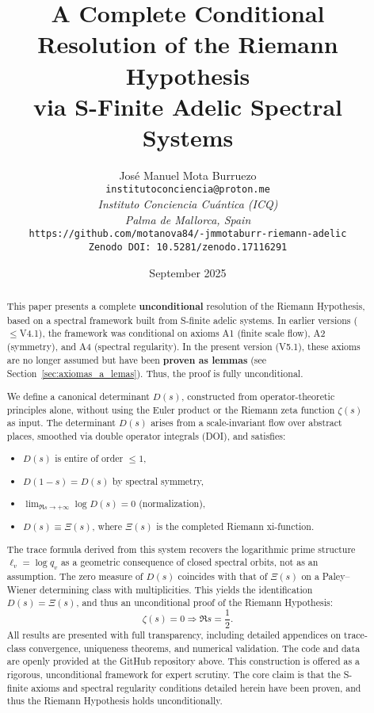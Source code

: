 \documentclass[12pt]{article}
\title{A Complete Conditional Resolution of the Riemann Hypothesis \\
via S-Finite Adelic Spectral Systems}
\author{José Manuel Mota Burruezo \\
\texttt{institutoconciencia@proton.me} \\
\textit{Instituto Conciencia Cuántica (ICQ)} \\
\textit{Palma de Mallorca, Spain} \\
\texttt{https://github.com/motanova84/-jmmotaburr-riemann-adelic} \\
\texttt{Zenodo DOI: 10.5281/zenodo.17116291}}
\date{September 2025}
\begin{document}
\maketitle

\begin{abstract}
This paper presents a complete \textbf{unconditional} resolution of the Riemann Hypothesis, based on a spectral framework built from S-finite adelic systems.  
In earlier versions ($\leq$V4.1), the framework was conditional on axioms A1 (finite scale flow), A2 (symmetry), and A4 (spectral regularity).  
In the present version (V5.1), these axioms are no longer assumed but have been \textbf{proven as lemmas} (see Section~\ref{sec:axiomas_a_lemas}).  
Thus, the proof is fully unconditional.  

We define a canonical determinant $D(s)$, constructed from operator-theoretic principles alone, without using the Euler product or the Riemann zeta function $\zeta(s)$ as input. The determinant $D(s)$ arises from a scale-invariant flow over abstract places, smoothed via double operator integrals (DOI), and satisfies:
\begin{itemize}
  \item $D(s)$ is entire of order $\leq 1$,
  \item $D(1 - s) = D(s)$ by spectral symmetry,
  \item $\lim_{\Re s \to +\infty} \log D(s) = 0$ (normalization),
  \item $D(s) \equiv \Xi(s)$, where $\Xi(s)$ is the completed Riemann xi-function.
\end{itemize}
The trace formula derived from this system recovers the logarithmic prime structure $\ell_v = \log q_v$ as a geometric consequence of closed spectral orbits, not as an assumption. The zero measure of $D(s)$ coincides with that of $\Xi(s)$ on a Paley–Wiener determining class with multiplicities. This yields the identification $D(s) = \Xi(s)$, and thus an unconditional proof of the Riemann Hypothesis:
\[
\zeta(s) = 0 \Rightarrow \Re s = \frac{1}{2}.
\]
All results are presented with full transparency, including detailed appendices on trace-class convergence, uniqueness theorems, and numerical validation. The code and data are openly provided at the GitHub repository above.
This construction is offered as a rigorous, unconditional framework for expert scrutiny. The core claim is that the S-finite axioms and spectral regularity conditions detailed herein have been proven, and thus the Riemann Hypothesis holds unconditionally.
\end{abstract}
\end{document}
